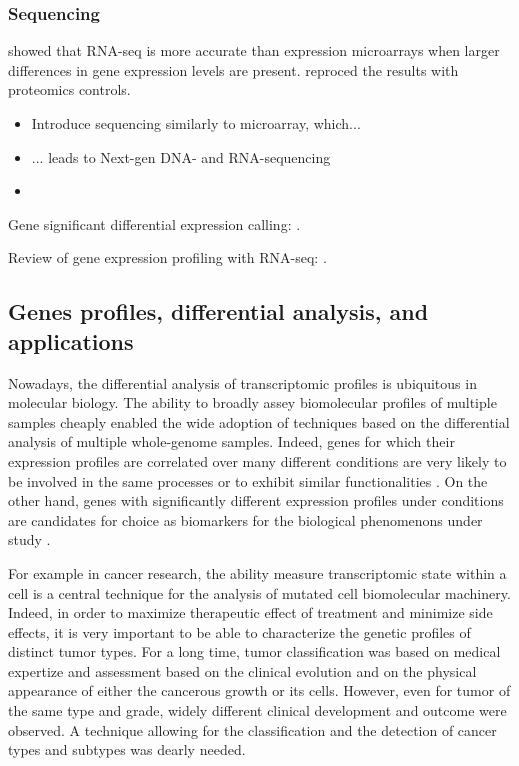 	\subsubsection{Sequencing}

	\Textcite{marioni2008rna} showed that RNA-seq is more accurate than expression microarrays when larger differences in gene expression levels are present. \Textcite{fu2009estimating} reproced the results with proteomics controls.

		\begin{itemize}
			\item Introduce sequencing similarly to microarray, which...
			\item ... leads to Next-gen DNA- and RNA-sequencing
			\item
		\end{itemize}

		Gene significant differential expression calling: \parencite{robinson2010edger}.

		Review of gene expression profiling with RNA-seq: \parencite{rapaport2013comprehensive}.

	\subsection{Genes profiles, differential analysis, and applications}
	\label{subsec:diffanalysis}

	Nowadays, the differential analysis of transcriptomic profiles is ubiquitous in molecular biology.
	The ability to broadly assey biomolecular profiles of multiple samples cheaply enabled the wide adoption of techniques based on the differential analysis of multiple whole-genome samples.
	Indeed, genes for which their expression profiles are correlated over many different conditions are very likely to be involved in the same processes or to exhibit similar functionalities \parencite{ideker2002discovering}.
	On the other hand, genes with significantly different expression profiles under conditions are candidates for choice as biomarkers for the biological phenomenons under study \parencite{altman2001whole}.

	For example in cancer research, the ability measure transcriptomic state within a cell is a central technique for the analysis of mutated cell biomolecular machinery.
	Indeed, in order to maximize therapeutic effect of treatment and minimize side effects, it is very important to be able to characterize the genetic profiles of distinct tumor types.
	For a long time, tumor classification was based on medical expertize and assessment based on the clinical evolution and on the physical appearance of either the cancerous growth or its cells.
	However, even for tumor of the same type and grade, widely different clinical development and outcome were observed.
	A technique allowing for the classification and the detection of cancer types and subtypes was dearly needed.


